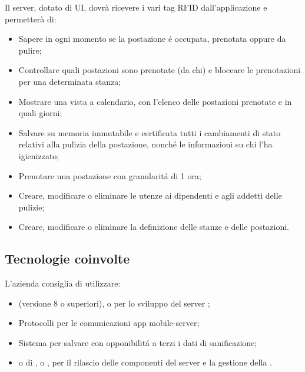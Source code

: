 Il server, dotato di UI, dovrà ricevere i vari tag RFID dall'applicazione e permetterà di:
\begin{itemize}
	\item Sapere in ogni momento se la postazione \'e occupata, prenotata oppure da pulire;
	\item Controllare quali postazioni sono prenotate (da chi) e bloccare le prenotazioni per una determinata stanza;
	\item Mostrare una vista a calendario, con l’elenco delle postazioni prenotate e in quali giorni;
	\item Salvare su memoria immutabile e certificata tutti i cambiamenti di stato relativi alla pulizia della postazione, nonch\'e le informazioni su chi l'ha igienizzato;
	\item Prenotare una postazione con granularit\'a di 1 ora;
	\item Creare, modificare o eliminare le utenze ai dipendenti e agli addetti delle pulizie;
	\item Creare, modificare o eliminare la definizione delle stanze e delle postazioni.
\end{itemize}

\subsection{Tecnologie coinvolte}
L'azienda consiglia di utilizzare:
\begin{itemize}
\item {} (versione 8 o superiori),  o  per lo sviluppo del server ;
\item Protocolli  per le comunicazioni app mobile-server;
\item Sistema  per salvare con opponibilit\'a a terzi i dati di sanificazione;
\item {} o di ,  o , per il rilascio delle componenti del server e la gestione della .
\end{itemize}


